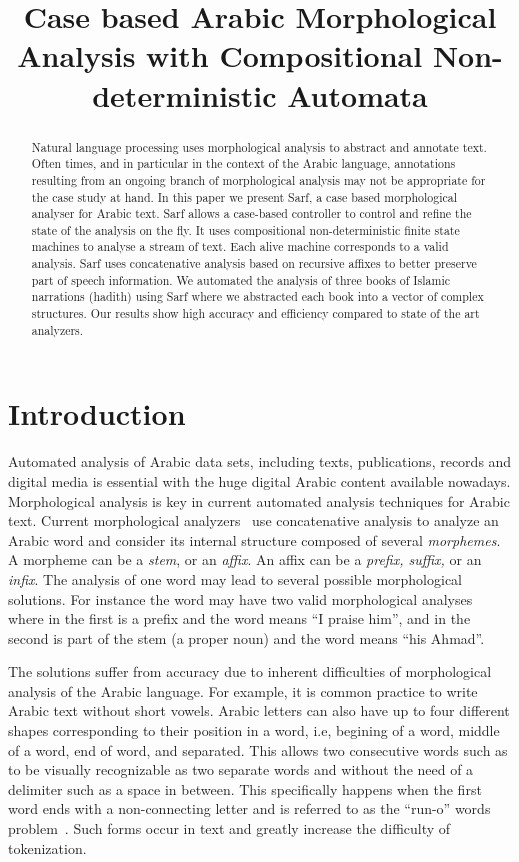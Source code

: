 \documentclass[11pt,letterpaper]{article}
\title{Case based Arabic Morphological Analysis with 
    Compositional Non-deterministic Automata }
\date{}
\begin{document}
\maketitle

\begin{abstract}
Natural language processing uses morphological 
analysis to abstract and annotate text.
Often times, and in particular in the context
of the Arabic language, annotations resulting from 
an ongoing branch of morphological analysis may not be
appropriate for the case study at hand. 
In this paper we present Sarf, a case based morphological 
analyser for Arabic text. 
Sarf allows a case-based controller to control and refine
the state of the analysis on the fly. 
It uses compositional non-deterministic finite state machines 
to analyse a stream of text. 
Each alive machine corresponds to a valid analysis. 
Sarf uses concatenative analysis based on recursive affixes 
to better preserve part of speech information.
We automated the analysis of three books of Islamic
narrations (hadith) using Sarf where we
abstracted each book into a vector of complex structures.
Our results show high accuracy and efficiency compared to
state of the art analyzers. 
\end{abstract}

\section{Introduction}

Automated analysis of Arabic data sets, including texts, 
publications, records and digital media is essential
with the huge digital Arabic content available nowadays. 
Morphological analysis is key in current automated 
analysis techniques for Arabic text. 
Current morphological analyzers~\cite{Sughaiyer:04}
use concatenative analysis
to analyze an Arabic word and
consider its internal structure composed of several
{\em morphemes}. A morpheme can be a {\em stem}, or an {\em affix}.
An affix can be a {\em prefix, suffix, } or an {\em infix}.
The analysis of one word may lead to several possible
morphological solutions.
\vocalize
For instance the word  
may have two valid morphological analyses where in the first
 is a prefix and the word means ``I praise him'',
and in the second  is part of the stem 
 (a proper noun)
and the word means ``his Ahmad''.

\novocalize
The solutions suffer from accuracy due to inherent difficulties
of morphological analysis of the Arabic language. 
For example, it is common practice to write Arabic text
without short vowels. 
Arabic letters can also have up to four different shapes 
corresponding to their position in a word, i.e, begining of 
a word, middle of a word, end of word, and separated. 
This allows two consecutive words such as 
to be visually recognizable
as two separate words  and  without 
the need of a delimiter such as a space in between. 
This specifically happens when the first word ends with
a non-connecting letter and is referred to as the ``run-o'' words
problem~\cite{Buckwalter:04}.
Such forms occur in text and greatly increase the
difficulty of tokenization.
\end{document}
